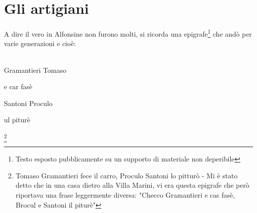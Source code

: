 
\chapter{Gli artigiani}

A dire il vero in Alfonsine non furono molti, si ricorda una epigrafe\footnote{Testo esposto pubblicamente su un supporto di materiale non deperibile} che andò per varie generazioni e cioè:
\\\\
\textcal \Huge
	\centerline{Gramantieri Tomaso}
	\centerline{e car fasè}
	\centerline{Santoni Proculo}
	\centerline{ul piturè}\normalfont \normalsize \footnote{Tomaso Gramantieri fece il carro, Proculo Santoni lo pitturò - Mi è stato detto che in una casa dietro alla Villa Marini, vi era questa epigrafe che però riportava una frase leggermente diversa: "Checco Gramantieri e cas fasè, Brocul e Santoni il piturè"}

